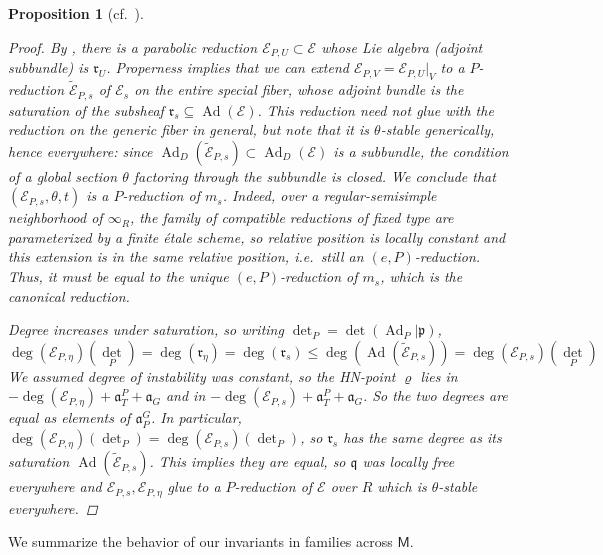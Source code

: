 \documentclass[openany]{amsbook}
\newtheorem{proposition}[theorem]{Proposition}
\theoremstyle{definition}
\theoremstyle{remark}
\numberwithin{equation}{section}
\newcommand{\cE}{\mathcal{E}}
\renewcommand{\-}{\operatorname{-}}
\renewcommand{\a}{\mathfrak{a}}
\newcommand{\fr}{\mathfrak{r}}
\newcommand{\on}[1]{\operatorname{#1}}
\newcommand{\wtilde}[1]{\widetilde{#1}}
\newcommand{\bM}{\mathsf{M}}
\newcommand{\fq}{\mathfrak{q}}
\newcommand{\Ad}{\on{Ad}}
\begin{document}
\begin{proposition}[{cf.\ \cite[7.1.3]{behrendthesis}}]
\begin{proof}
        By \cite[Lemma 7.1.2]{behrendthesis}, there is a parabolic reduction $\cE_{P,U} \subset \cE$ whose Lie algebra (adjoint subbundle) is $\fr_U$. Properness implies that we can extend $\cE_{P,V} = \cE_{P,U}|_{V}$ to a $P$-reduction $\wtilde{\cE}_{P,s}$ of $\cE_s$ on the entire special fiber, whose adjoint bundle is the saturation of the subsheaf $\fr_s \subseteq \Ad(\cE)$. This reduction need not glue with the reduction on the generic fiber in general, but note that it is $\theta$-stable generically, hence everywhere: since $\Ad_D(\wtilde{\cE}_{P,s}) \subset \Ad_D(\cE)$ is a subbundle, the condition of a global section $\theta$ factoring through the subbundle is closed.  We conclude that $(\cE_{P,s}, \theta, t)$ is a $P$-reduction of $m_s$. Indeed, over a regular-semisimple neighborhood of $\infty_R$, the family of compatible reductions of fixed type are parameterized by a finite \'etale scheme, so relative position is locally constant and this extension is in the same relative position, i.e.\ still an $(e,P)$-reduction. Thus, it must be equal to the unique $(e,P)$-reduction of $m_s$, which is the canonical reduction.

        Degree increases under saturation, so writing $\det_P = \det(\Ad_P | \mathfrak{p})$,
        $$
        \deg(\cE_{P,\eta})(\det_P) = \deg(\fr_\eta) = \deg(\fr_s) \le \deg(\Ad(\wtilde{\cE}_{P,s})) = \deg(\cE_{P,s})(\det_P)
        $$
        We assumed degree of instability was constant, so the HN-point $\varrho$ lies in $-\deg(\cE_{P,\eta}) + \a_T^P + \a_G$ \emph{and} in $-\deg(\cE_{P, s}) + \a_T^P + \a_G$. So the two degrees are equal as elements of $\a_P^G$. In particular, $\deg(\cE_{P,\eta})(\det_P) = \deg(\cE_{P,s})(\det_P)$, so $\fr_s$ has the same degree as its saturation $\Ad(\wtilde{\cE}_{P,s})$. This implies they are equal, so $\fq$ was locally free everywhere and $\cE_{P,s}, \cE_{P, \eta}$ glue to a $P$-reduction of $\cE$ over $R$ which is $\theta$-stable everywhere. 
    \end{proof}
\end{proposition}

We summarize the behavior of our invariants in families across $\bM$.
\end{document}
